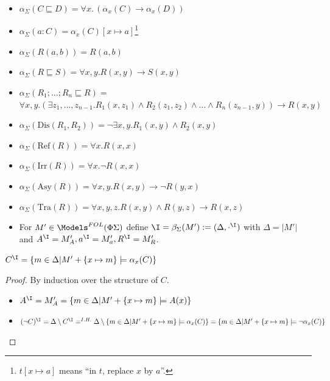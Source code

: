 \documentclass[10pt, a4paper]{isov2}
\begin{document}
\begin{itemize}
 \item $\alpha_\Sigma (C \sqsubseteq D) = \forall x.\, (\alpha_x(C) \rightarrow \alpha_x(D))$
 \item $\alpha_\Sigma (a:C) = \alpha_x(C)[x\mapsto a]$\footnote{$t[x\mapsto a]$ means ``in $t$, replace $x$ by $a$''.}
 \item $\alpha_\Sigma (R(a,b)) = R(a,b)$
 \item $\alpha_\Sigma (R \sqsubseteq S) = \forall x, y. R(x,y) \rightarrow S(x,y) $
 \item $\alpha_\Sigma (R_1; \ldots; R_n \sqsubseteq R) =$\\
$ \forall x,y . (\exists z_1,\ldots, z_{n-1} . R_1(x,z_1) \wedge R_2(z_1,z_2) \wedge \ldots \wedge R_n(z_{n-1},y)) \rightarrow R(x,y) $
 \item $\alpha_\Sigma (\text{Dis}(R_1,R_2)) = \neg\exists x,y . R_1(x,y)\wedge R_2(x,y)$	
 \item $\alpha_\Sigma (\text{Ref}(R)) = \forall x. R(x,x)$
 \item $\alpha_\Sigma (\text{Irr}(R)) = \forall x. \neg R(x,x)$
 \item $\alpha_\Sigma (\text{Asy}(R)) = \forall x,y . R(x,y) \rightarrow \neg R(y,x)$
 \item $\alpha_\Sigma (\text{Tra}(R)) = \forall x,y,z . R(x,y) \wedge R(y,z) \rightarrow R(x,z)$
\end{itemize}



\begin{itemize}
	\item For $M' \in \Models^{FOL}(\Phi \Sigma)$ define $\I=\beta_\Sigma(M') := (\Delta, \cdot^\I)$
	with $\Delta = |M'|$ and $A^\I = M'_A, a^\I = M'_a, R^\I = M'_R$.
\end{itemize}

	\begin{proposition}
$C^\I = \left\{m \in \Delta \lvert M' + \{x \mapsto m \} \models \alpha_x (C) \right\}$
	\end{proposition}
	
	\begin{proof} By induction over the structure of $C$.
\begin{itemize}
	\item $A^\I = M'_A = \left \{m \in \Delta \vert M' + \{x \mapsto m \} \models A(x)  \right\}$
	\item $(\lnot C)^\I = \Delta \setminus C^\I =^{I.H.} \Delta \setminus \{m \in \Delta \lvert M' + \{x \mapsto m\} \models \alpha_x(C)\} = \{m \in \Delta  \vert M' + \{x \mapsto m\} \models \lnot \alpha_x(C)\}$
\end{itemize}
	\end{proof}
\end{document}
